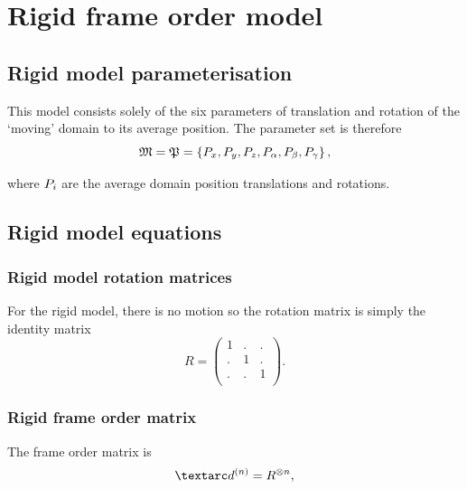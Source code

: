 



\section{Rigid frame order model}

\subsection{Rigid model parameterisation}

This model consists solely of the six parameters of translation and rotation of the `moving' domain to its average position.
The parameter set is therefore
\begin{equation}
    \mathfrak{M} = \mathfrak{P} = \left\{ P_x, P_y, P_z, P_\alpha, P_\beta, P_\gamma \right\},
\end{equation}

where $P_i$ are the average domain position translations and rotations.


\subsection{Rigid model equations}

\subsubsection{Rigid model rotation matrices}

For the rigid model, there is no motion so the rotation matrix is simply the identity matrix
\begin{equation}
    R =
        \begin{pmatrix}
            1 & . & . \\
            . & 1 & . \\
            . & . & 1 \\
        \end{pmatrix}.
\end{equation}


\subsubsection{Rigid frame order matrix}

The frame order matrix is
\begin{equation}
    \FOn = R^{\otimes n} ,
\end{equation}

